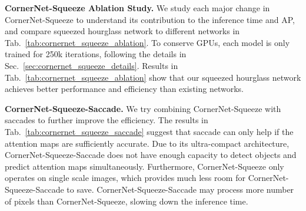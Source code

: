\documentclass{bmvc2k}
\begin{document}
\smallskip \noindent \textbf{CornerNet-Squeeze Ablation Study.} We study each major change in CornerNet-Squeeze to understand its contribution to the inference time and AP, and compare squeezed hourglass network to different networks in Tab.~\ref{tab:cornernet_squeeze_ablation}. To conserve GPUs, each model is only trained for 250k iterations, following the details in Sec.~\ref{sec:cornernet_squeeze_details}. Results in Tab.~\ref{tab:cornernet_squeeze_ablation} show that our squeezed hourglass network achieves better performance and efficiency than existing networks.

\begin{table}
    \centering
    \caption{Saccade only helps if the attention maps are sufficiently accurate.}
    \label{tab:cornernet_squeeze_saccade}
    \vspace{-3mm}
\end{table}

\smallskip \noindent \textbf{CornerNet-Squeeze-Saccade.} We try combining CornerNet-Squeeze with saccades to further improve the efficiency. The results in Tab.~\ref{tab:cornernet_squeeze_saccade} suggest that saccade can only help if the attention maps are sufficiently accurate. Due to its ultra-compact architecture, CornerNet-Squeeze-Saccade does not have enough capacity to detect objects and predict attention maps simultaneously. Furthermore, CornerNet-Squeeze only operates on single scale images, which provides much less room for CornerNet-Squeeze-Saccade to save. CornerNet-Squeeze-Saccade may process more number of pixels than CornerNet-Squeeze, slowing down the inference time.
\end{document}
